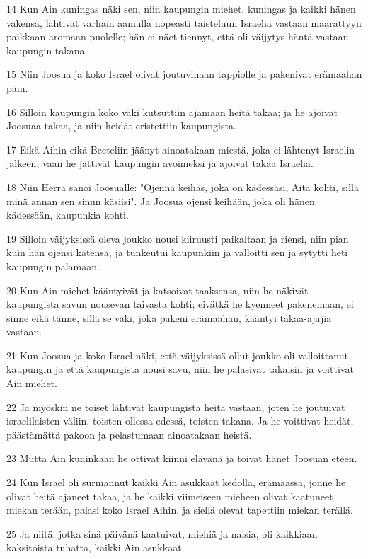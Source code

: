 \par 14 Kun Ain kuningas näki sen, niin kaupungin miehet, kuningas ja kaikki hänen väkensä, lähtivät varhain aamulla nopeasti taisteluun Israelia vastaan määrättyyn paikkaan aromaan puolelle; hän ei näet tiennyt, että oli väijytys häntä vastaan kaupungin takana.
\par 15 Niin Joosua ja koko Israel olivat joutuvinaan tappiolle ja pakenivat erämaahan päin.
\par 16 Silloin kaupungin koko väki kutsuttiin ajamaan heitä takaa; ja he ajoivat Joosuaa takaa, ja niin heidät eristettiin kaupungista.
\par 17 Eikä Aihin eikä Beeteliin jäänyt ainoatakaan miestä, joka ei lähtenyt Israelin jälkeen, vaan he jättivät kaupungin avoimeksi ja ajoivat takaa Israelia.
\par 18 Niin Herra sanoi Joosualle: "Ojenna keihäs, joka on kädessäsi, Aita kohti, sillä minä annan sen sinun käsiisi". Ja Joosua ojensi keihään, joka oli hänen kädessään, kaupunkia kohti.
\par 19 Silloin väijyksissä oleva joukko nousi kiiruusti paikaltaan ja riensi, niin pian kuin hän ojensi kätensä, ja tunkeutui kaupunkiin ja valloitti sen ja sytytti heti kaupungin palamaan.
\par 20 Kun Ain miehet kääntyivät ja katsoivat taaksensa, niin he näkivät kaupungista savun nousevan taivasta kohti; eivätkä he kyenneet pakenemaan, ei sinne eikä tänne, sillä se väki, joka pakeni erämaahan, kääntyi takaa-ajajia vastaan.
\par 21 Kun Joosua ja koko Israel näki, että väijyksissä ollut joukko oli valloittanut kaupungin ja että kaupungista nousi savu, niin he palasivat takaisin ja voittivat Ain miehet.
\par 22 Ja myöskin ne toiset lähtivät kaupungista heitä vastaan, joten he joutuivat israelilaisten väliin, toisten ollessa edessä, toisten takana. Ja he voittivat heidät, päästämättä pakoon ja pelastumaan ainoatakaan heistä.
\par 23 Mutta Ain kuninkaan he ottivat kiinni elävänä ja toivat hänet Joosuan eteen.
\par 24 Kun Israel oli surmannut kaikki Ain asukkaat kedolla, erämaassa, jonne he olivat heitä ajaneet takaa, ja he kaikki viimeiseen mieheen olivat kaatuneet miekan terään, palasi koko Israel Aihin, ja siellä olevat tapettiin miekan terällä.
\par 25 Ja niitä, jotka sinä päivänä kaatuivat, miehiä ja naisia, oli kaikkiaan kaksitoista tuhatta, kaikki Ain asukkaat.
